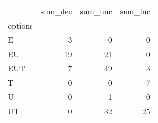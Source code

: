 \begin{tabular}{lrrr}
\toprule
{} &  sum\_dec &  sum\_unc &  sum\_inc \\
options &          &          &          \\
\midrule
E       &        3 &        0 &        0 \\
EU      &       19 &       21 &        0 \\
EUT     &        7 &       49 &        3 \\
T       &        0 &        0 &        7 \\
U       &        0 &        1 &        0 \\
UT      &        0 &       32 &       25 \\
\bottomrule
\end{tabular}
